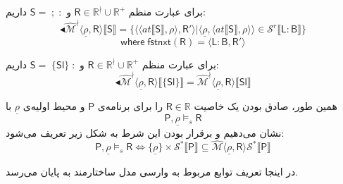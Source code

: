 برای عبارت منظم 
$\mathsf{R} \in \mathbb{R}^\nmid \cup \mathbb{R^+}$
و 
$\mathsf{S= \; ; \;:}$
داریم:
$$\blacktriangleleft\mathcal{\hat{M}^\nmid}  \langle \underline{\rho}, \mathsf{R} \rangle \llbracket \mathsf{S} \rrbracket = \{\langle \langle at \llbracket \mathsf{S} \rrbracket , \rho \rangle , \mathsf{R'} \rangle | \langle \underline{\rho}, \langle at \llbracket \mathsf{S} \rrbracket , \rho \rangle \rangle \in \mathcal{S}^r \llbracket \mathsf{L:B}\rrbracket\}$$
$$\mathsf{where \; fstnxt (R) = \langle L:B,R' \rangle}$$
	
	

برای عبارت منظم 
$\mathsf{R} \in \mathbb{R}^\nmid \cup \mathbb{R^+}$
و 
$\mathsf{S= \; \{Sl\} \;:}$
داریم:
$$\blacktriangleleft \mathcal{\hat{M}^\nmid} \langle \underline{\rho}, \mathsf{R} \rangle \llbracket \{\mathsf{Sl}\} \rrbracket =
 \mathcal{\hat{M}^\nmid} \langle \underline{\rho}, \mathsf{R} \rangle \llbracket \mathsf{Sl} \rrbracket$$


همین طور، صادق بودن یک خاصیت $\mathsf{R} \in \mathbb{R}$ را برای برنامه‌ی $\mathsf{P}$ و محیط اولیه‌ی $\underline{\rho}$ با 
$$\mathsf{P} , \underline{\rho} \models_s \mathsf{R}$$
نشان می‌دهیم و برقرار بودن این شرط به شکل زیر تعریف می‌شود:
$$\mathsf{P} , \underline{\rho} \models_s \mathsf{R} \iff \{\underline{\rho}\} \times \mathcal{S}^* \llbracket \mathsf{P} \rrbracket \subseteq \hat{\mathcal{M}} \langle \underline{\rho} , \mathsf{R} \rangle \mathcal{S}^* \llbracket \mathsf{P} \rrbracket$$

در اینجا تعریف توابع مربوط به وارسی مدل ساختارمند به پایان می‌رسد.

 
 
 
 
 